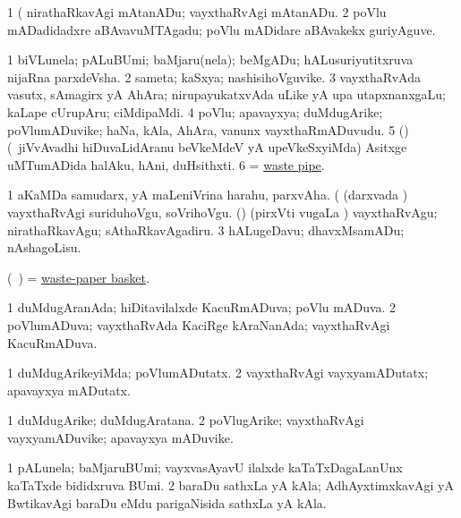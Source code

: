 \noindent 
\gl{\pagu}
\expl{}
\bmng
\bnum
\num{1}  (  nirathaRkavAgi mAtanADu; vayxthaRvAgi mAtanADu. 
\num{2}  poVlu mADadidadxre aBAvavuMTAgadu; poVlu mADidare aBAvakekx guriyAguve. 
\enum
\emng
\eentry

\bentry
{} 
\gl{\nA}
\expl{}
\bmng
\bnum
\num{1} biVLunela; pALuBUmi; baMjaru(nela); beMgADu; hALusuriyutitxruva nijaRna parxdeVsha. 
\num{2} sameta; kaSxya; nashisihoVguvike. 
\num{3} vayxthaRvAda vasutx, sAmagirx yA AhAra; nirupayukatxvAda uLike yA upa utapxnanxgaLu; kaLape cUrupAru; ciMdipaMdi. 
\num{4} poVlu; apavayxya; duMdugArike; poVlumADuvike; haNa, kAla, AhAra, \mo vanunx vayxthaRmADuvudu. 
\num{5} (\nAyxshA) (\kanmu\ jiVvAvadhi hiDuvaLidAranu beVkeMdeV yA upeVkeSxyiMda) Asitxge uMTumADida halAku, hAni, duHsithxti. 
\num{6} = \hyperlink{waste pipe}{waste pipe}. 
\enum
\emng

\noindent 
\gl{\pagu}
\expl{}
\bmng
\bnum
\num{1}  aKaMDa samudarx, yA maLeniVrina harahu, parxvAha. 
  (  
\banum
{} (darxvada \vi) vayxthaRvAgi suriduhoVgu, soVrihoVgu. 
 (\rUpa) (pirxVti \mo vugaLa \vi) vayxthaRvAgu; nirathaRkavAgu; sAthaRkavAgadiru. 
\eanum
\numie
\num{3}  hALugeDavu; dhavxMsamADu; nAshagoLisu. 
\enum
\emng
\eentry

\bentry
{} 
\gl{\nA}
\expl{}
\bmng
(\kanmu\ \ame) = \hyperlink{waste-paper basket}{waste-paper basket}. 
\emng
\eentry

\bentry
{} 
\gl{\gu}
\expl{}
\bmng
\bnum
\num{1} duMdugAranAda; hiDitavilalxde KacuRmADuva; poVlu mADuva. 
\num{2} poVlumADuva; vayxthaRvAda KaciRge kAraNanAda; vayxthaRvAgi KacuRmADuva. 
\enum
\emng
\eentry

\bentry
{} 
\gl{\kirxvi}
\expl{}
\bmng
\bnum
\num{1} duMdugArikeyiMda; poVlumADutatx. 
\num{2} vayxthaRvAgi vayxyamADutatx; apavayxya mADutatx. 
\enum
\emng
\eentry

\bentry
{} 
\gl{\nA}
\expl{}
\bmng
\bnum
\num{1} duMdugArike; duMdugAratana. 
\num{2} poVlugArike; vayxthaRvAgi vayxyamADuvike; apavayxya mADuvike. 
\enum
\emng
\eentry

\bentry
{} 
\gl{\nA}
\expl{}
\bmng
\bnum
\num{1} pALunela; baMjaruBUmi; vayxvasAyavU ilalxde kaTaTxDagaLanUnx kaTaTxde bididxruva BUmi. 
\num{2} baraDu sathxLa yA kAla; AdhAyxtimxkavAgi yA BwtikavAgi baraDu eMdu parigaNisida sathxLa yA kAla. 
\enum
\emng
\eentry

